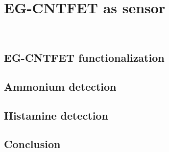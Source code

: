 \chapter{EG-CNTFET as sensor}
\label{cap:chapter4}

\newpage
\thispagestyle{empty}
\ %
\newpage


\section{EG-CNTFET functionalization}
\label{sec:EGFETfunctionalization}




\section{Ammonium detection}
\label{sec:ammonium}




\section{Histamine detection}
\label{sec:histamine}




\section{Conclusion}

\newpage
\thispagestyle{empty}
\ %
\newpage